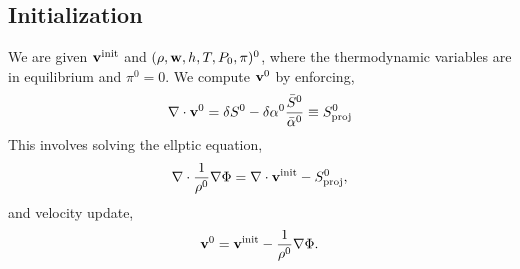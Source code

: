 \documentclass[final]{siamltex}
\def\vb {{\bf v}}
\def\wb {{\bf w}}
\begin{document}
\subsection{Initialization}
We are given $\vb^{\rm init}$ and $(\rho,\wb,h,T,P_0,\pi)^0$,
where the thermodynamic variables are in equilibrium
and $\pi^0=0$.  We compute $\vb^0$ by enforcing,
\begin{equation}
\nabla\cdot\vb^0 = \delta S^0 - \delta\alpha^0\frac{\bar{S}^0}{\bar{\alpha}^0} \equiv S_{\rm proj}^0
\end{equation}
This involves solving the ellptic equation,
\begin{equation}
\nabla\cdot\frac{1}{\rho^0}\nabla\Phi = \nabla\cdot\vb^{\rm init} - S_{\rm proj}^0,
\end{equation}
and velocity update,
\begin{equation}
\vb^0 = \vb^{\rm init} - \frac{1}{\rho^0}\nabla\Phi.
\end{equation}
\end{document}
